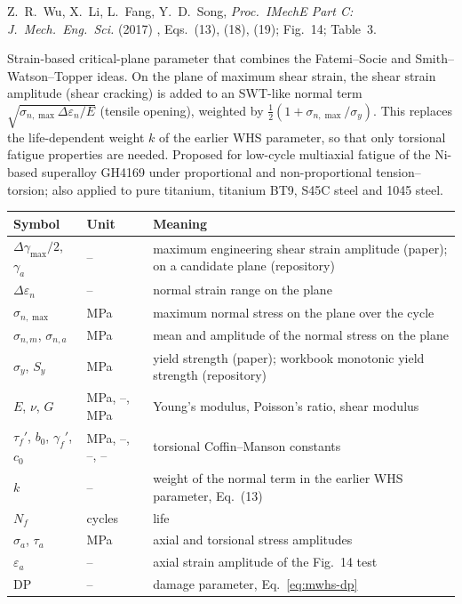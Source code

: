 \label{sheet:MWHS}

 Z.~R.~Wu, X.~Li, L.~Fang, Y.~D.~Song, \emph{Proc.\ IMechE Part C: J.\ Mech.\ Eng.\
Sci.} (2017) \cite{wu2017}, Eqs.~(13), (18), (19); Fig.~14; Table~3.

 Strain-based critical-plane parameter that combines the Fatemi--Socie and
Smith--Watson--Topper ideas. On the plane of maximum shear strain, the shear strain amplitude
(shear cracking) is added to an SWT-like normal term $\sqrt{\sigma_{n,\max}\Delta\varepsilon_n/E}$
(tensile opening), weighted by $\tfrac12(1+\sigma_{n,\max}/\sigma_y)$. This replaces the
life-dependent weight $k$ of the earlier WHS parameter, so that only torsional fatigue properties
are needed. Proposed for low-cycle multiaxial fatigue of the Ni-based superalloy GH4169 under
proportional and non-proportional tension--torsion; also applied to pure titanium, titanium BT9,
S45C steel and 1045 steel.

\begin{center}\small
\begin{tabular}{@{}llp{100mm}@{}}
\toprule
Symbol & Unit & Meaning\\\midrule
$\Delta\gamma_{\max}/2$, $\gamma_a$ & -- & maximum engineering shear strain amplitude (paper); on a candidate plane (repository)\\
$\Delta\varepsilon_n$ & -- & normal strain range on the plane\\
$\sigma_{n,\max}$ & MPa & maximum normal stress on the plane over the cycle\\
$\sigma_{n,m}$, $\sigma_{n,a}$ & MPa & mean and amplitude of the normal stress on the plane\\
$\sigma_y$, $S_y$ & MPa & yield strength (paper); workbook monotonic yield strength (repository)\\
$E$, $\nu$, $G$ & MPa, --, MPa & Young's modulus, Poisson's ratio, shear modulus\\
$\tau_f'$, $b_0$, $\gamma_f'$, $c_0$ & MPa, --, --, -- & torsional Coffin--Manson constants\\
$k$ & -- & weight of the normal term in the earlier WHS parameter, Eq.~(13)\\
$N_f$ & cycles & life\\
$\sigma_a$, $\tau_a$ & MPa & axial and torsional stress amplitudes\\
$\varepsilon_a$ & -- & axial strain amplitude of the Fig.~14 test\\
$\mathrm{DP}$ & -- & damage parameter, Eq.~\eqref{eq:mwhs-dp}\\
\bottomrule
\end{tabular}
\end{center}

